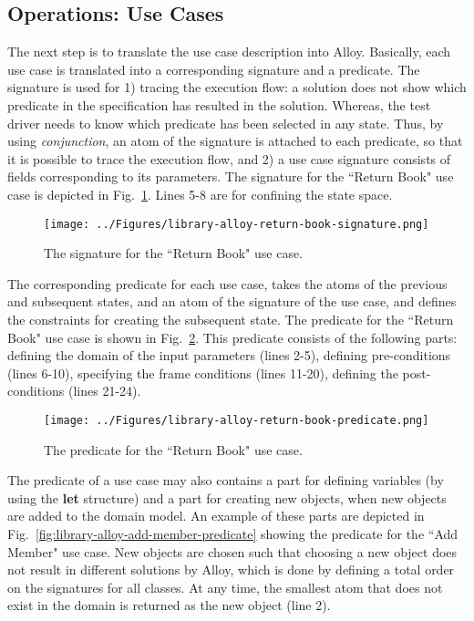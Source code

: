 \subsection{Operations: Use Cases}
\label{sec:alloy-usecases}
The next step is to translate the use case description into Alloy. Basically, each use case is translated into a corresponding signature and a predicate. The signature is used for 1) tracing the execution flow: a solution does not show which predicate in the specification has resulted in the solution. Whereas, the test driver needs to know which predicate has been selected in any state. Thus, by using \textit{conjunction}, an atom of the signature is attached to each predicate, so that it is possible to trace the execution flow, and 2) a use case signature consists of fields corresponding to its parameters. The signature for the ``Return Book" use case is depicted in Fig.~\ref{fig:library-alloy-return-book-signature}. Lines 5-8 are for confining the state space.

\begin{figure}[h]
\centering
\texttt{[image: ../Figures/library-alloy-return-book-signature.png]}
\caption{The signature for the ``Return Book" use case.}
\label{fig:library-alloy-return-book-signature}
\end{figure}

The corresponding predicate for each use case, takes the atoms of the previous and subsequent states, and an atom of the signature of the use case, and defines the constraints for creating the subsequent state. The predicate for the ``Return Book" use case is shown in Fig.~\ref{fig:library-alloy-return-book-predicate}. This predicate consists of the following parts: defining the domain of the input parameters (lines 2-5), defining pre-conditions (lines 6-10), specifying the frame conditions (lines 11-20), defining the post-conditions (lines 21-24). 

\begin{figure}[h]
\centering
\texttt{[image: ../Figures/library-alloy-return-book-predicate.png]}
\caption{The predicate for the ``Return Book" use case.}
\label{fig:library-alloy-return-book-predicate}
\end{figure}

The predicate of a use case may also contains a part for defining variables (by using the \textbf{let} structure) and a part for creating new objects, when new objects are added to the domain model. An example of these parts are depicted in Fig.~\ref{fig:library-alloy-add-member-predicate} showing the predicate for the ``Add Member" use case. New objects are chosen such that  choosing a new object does not result in different solutions by Alloy, which is done by defining a total order on the signatures for all classes. At any time, the smallest atom that does not exist in the domain is returned as the new object (line 2).

